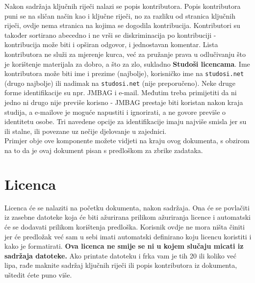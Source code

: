 \documentclass{studosi-workbook}
\begin{document}
	Nakon sadržaja ključnih riječi nalazi se popis kontributora. Popis kontributora puni se na sličan način kao i ključne riječi, no za razliku od stranica ključnih riječi, ovdje nema stranica na kojima se dogodila kontribucija. Kontributori su također sortirano abecedno i ne vrši se diskriminacija po kontribuciji - kontribucija može biti i opširan odgovor, i jednostavan komentar. Lista kontributora ne služi za mjerenje kurca, već za pružanje prava u odlučivanju što je korištenje materijala za dobro, a što za zlo, sukladno \textbf{\textcolor{tagcolor}{Studoši licencama}}. Ime kontributora može biti ime i prezime (najbolje), korisničko ime na \texttt{studosi.net} (drugo najbolje) ili nadimak na \texttt{studosi.net} (nije preporučeno). Neke druge forme identifikacije su npr. JMBAG i e-mail. Međutim treba primijetiti da ni jedno ni drugo nije previše korisno - JMBAG prestaje biti koristan nakon kraja studija, a e-mailove je moguće napustiti i ignorirati, a ne govore previše o identitetu osobe. Tri navedene opcije za identifikacije imaju najviše smisla jer su ili stalne, ili povezane uz nečije djelovanje u zajednici. \\
	
	Primjer obje ove komponente možete vidjeti na kraju ovog dokumenta, s obzirom na to da je ovaj dokument pisan s predloškom za zbrike zadataka.
	
	
	\section{Licenca}
	Licenca će se nalaziti na početku dokumenta, nakon sadržaja. Ona će se povlačiti iz zasebne datoteke koja će biti ažurirana prilikom ažuriranja licence i automatski će se dodavati prilikom korištenja predloška. Korisnik ovdje ne mora ništa činiti jer će predložak već sam u sebi imati automatski definirano koju licencu koristiti i kako je formatirati. \textbf{Ova licenca ne smije se ni u kojem slučaju micati iz sadržaja datoteke.} Ako printate datoteku i frka vam je tih 20 ili koliko već lipa, rađe maknite sadržaj ključnih riječi ili popis kontributora iz dokumenta, uštedit ćete puno više.
	
\end{document}
